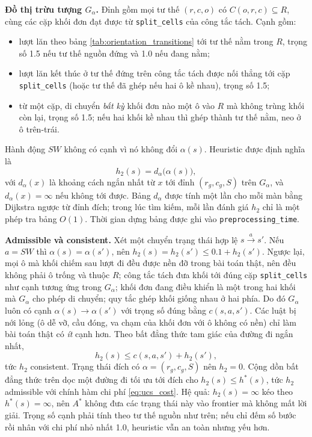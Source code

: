 \textbf{Đồ thị trừu tượng $G_\alpha$.} Đỉnh gồm mọi tư thế $(r,c,o)$ có $C(o,r,c)\subseteq R$, cùng các cặp khối đơn đạt được từ \texttt{split\_cells} của công tắc tách. Cạnh gồm:
\begin{itemize}
    \item lượt lăn theo bảng \ref{tab:orientation_transitions} tới tư thế nằm trong $R$, trọng số 1.5 nếu tư thế nguồn đứng và 1.0 nếu đang nằm;
    \item lượt lăn kết thúc ở tư thế đứng trên công tắc tách được nối thẳng tới cặp \texttt{split\_cells} (hoặc tư thế đã ghép nếu hai ô kề nhau), trọng số 1.5;
    \item từ một cặp, di chuyển \emph{bất kỳ} khối đơn nào một ô vào $R$ mà không trùng khối còn lại, trọng số 1.5; nếu hai khối kề nhau thì ghép thành tư thế nằm, neo ở ô trên-trái.
\end{itemize}
Hành động $\mathit{SW}$ không có cạnh vì nó không đổi $\alpha(s)$. Heuristic được định nghĩa là
\begin{equation}
    h_2(s)=d_\alpha\bigl(\alpha(s)\bigr),
    \label{eq:astar_heuristic}
\end{equation}
với $d_\alpha(x)$ là khoảng cách ngắn nhất từ $x$ tới đỉnh $(r_g,c_g,S)$ trên $G_\alpha$, và $d_\alpha(x)=\infty$ nếu không tới được. Bảng $d_\alpha$ được tính một lần cho mỗi màn bằng Dijkstra ngược từ đỉnh đích; trong lúc tìm kiếm, mỗi lần đánh giá $h_2$ chỉ là một phép tra bảng $O(1)$. Thời gian dựng bảng được ghi vào \texttt{preprocessing\_time}.

\textbf{Admissible và consistent.} Xét một chuyển trạng thái hợp lệ $s\xrightarrow{a}s'$. Nếu $a=\mathit{SW}$ thì $\alpha(s)=\alpha(s')$, nên $h_2(s)=h_2(s')\le 0.1+h_2(s')$. Ngược lại, mọi ô mà khối chiếm sau lượt đi đều được nền đỡ trong bài toán thật, nên đều không phải ô trống và thuộc $R$; công tắc tách đưa khối tới đúng cặp \texttt{split\_cells} như cạnh tương ứng trong $G_\alpha$; khối đơn đang điều khiển là một trong hai khối mà $G_\alpha$ cho phép di chuyển; quy tắc ghép khối giống nhau ở hai phía. Do đó $G_\alpha$ luôn có cạnh $\alpha(s)\to\alpha(s')$ với trọng số đúng bằng $c(s,a,s')$. Các luật bị nới lỏng (ô dễ vỡ, cầu đóng, va chạm của khối đơn với ô không có nền) chỉ làm bài toán thật có \emph{ít} cạnh hơn. Theo bất đẳng thức tam giác của đường đi ngắn nhất,
\[
 h_2(s)\le c(s,a,s')+h_2(s'),
\]
tức $h_2$ consistent. Trạng thái đích có $\alpha=(r_g,c_g,S)$ nên $h_2=0$. Cộng dồn bất đẳng thức trên dọc một đường đi tối ưu tới đích cho $h_2(s)\le h^*(s)$, tức $h_2$ admissible với chính hàm chi phí \eqref{eq:ucs_cost}. Hệ quả: $h_2(s)=\infty$ kéo theo $h^*(s)=\infty$, nên $A^*$ không đưa các trạng thái này vào frontier mà không mất lời giải. Trọng số cạnh phải tính theo tư thế nguồn như trên; nếu chỉ đếm số bước rồi nhân với chi phí nhỏ nhất 1.0, heuristic vẫn an toàn nhưng yếu hơn.

